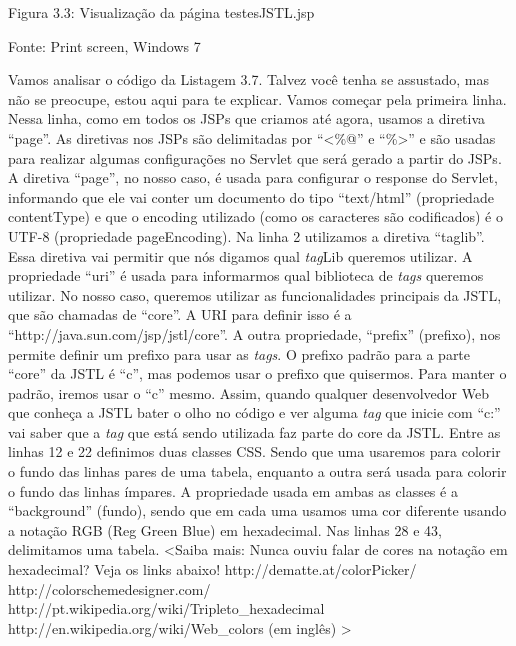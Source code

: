 Figura 3.3: Visualização da página testesJSTL.jsp
 
Fonte: Print screen, Windows 7

Vamos analisar o código da Listagem 3.7. Talvez você tenha se assustado, mas não se preocupe, estou aqui para te explicar. Vamos começar pela primeira linha. Nessa linha, como em todos os JSPs que criamos até agora, usamos a diretiva ``page''. As diretivas nos JSPs são delimitadas por ``<\%@'' e ``\%>'' e são usadas para realizar algumas configurações no Servlet que será gerado a partir do JSPs. A diretiva ``page'', no nosso caso, é usada para configurar o response do Servlet, informando que ele vai conter um documento do tipo ``text/html'' (propriedade contentType) e que o encoding utilizado (como os caracteres são codificados) é o UTF-8 (propriedade pageEncoding). 
Na linha 2 utilizamos a diretiva ``taglib''. Essa diretiva vai permitir que nós digamos qual \textit{tag}Lib queremos utilizar. A propriedade ``uri'' é usada para informarmos qual biblioteca de \textit{tags} queremos utilizar. No nosso caso, queremos utilizar as funcionalidades principais da JSTL, que são chamadas de ``core''. A URI para definir isso é a ``http://java.sun.com/jsp/jstl/core''. A outra propriedade, ``prefix'' (prefixo), nos permite definir um prefixo para usar as \textit{tags}. O prefixo padrão para a parte ``core'' da JSTL é ``c'', mas podemos usar o prefixo que quisermos. Para manter o padrão, iremos usar o ``c'' mesmo. Assim, quando qualquer desenvolvedor Web que conheça a JSTL bater o olho no código e ver alguma \textit{tag} que inicie com ``c:'' vai saber que a \textit{tag} que está sendo utilizada faz parte do core da JSTL.
Entre as linhas 12 e 22 definimos duas classes CSS. Sendo que uma usaremos para colorir o fundo das linhas pares de uma tabela, enquanto a outra será usada para colorir o fundo das linhas ímpares. A propriedade usada em ambas as classes é a ``background'' (fundo), sendo que em cada uma usamos uma cor diferente usando a notação RGB (Reg Green Blue) em hexadecimal. Nas linhas 28 e 43, delimitamos uma tabela.
<Saiba mais:
Nunca ouviu falar de cores na notação em hexadecimal? Veja os links abaixo!
http://dematte.at/colorPicker/
http://colorschemedesigner.com/
http://pt.wikipedia.org/wiki/Tripleto\_hexadecimal
http://en.wikipedia.org/wiki/Web\_colors (em inglês)
>
